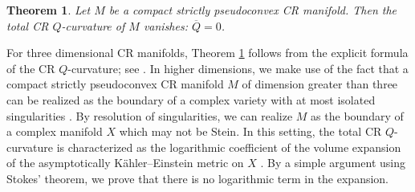 \documentclass[10pt,a4paper]{amsart}
\numberwithin{equation}{section}
\newtheorem{Theorem}{Theorem}[section]
\begin{document}
\begin{Theorem}\label{van-total-CR-Q}
Let $M$ be a compact strictly pseudoconvex CR manifold. Then the total CR $Q$-curvature of $M$ vanishes: $\overline{Q}=0$.
\end{Theorem}


For three dimensional CR manifolds, Theorem \ref{van-total-CR-Q} follows from the explicit formula of the CR $Q$-curvature; see \cite{Fefferman/Hirachi}. In higher dimensions, we make use of the fact that a compact strictly pseudoconvex CR manifold $M$ of dimension greater than three can be realized as the boundary of a complex variety with at most isolated singularities \cite{Monvel, Harvey/Lawson:1975,
Harvey/Lawson:1977}. By resolution of singularities, we can realize $M$ as the boundary of a complex manifold $X$ which may not be Stein. In this setting, the total CR $Q$-curvature is characterized as the logarithmic coef\/f\/icient of the volume expansion of the asymptotically K\"ahler--Einstein metric on $X$ \cite{Seshadri}. By a simple argument using Stokes' theorem, we prove that there is no logarithmic term in the expansion.
\end{document}
